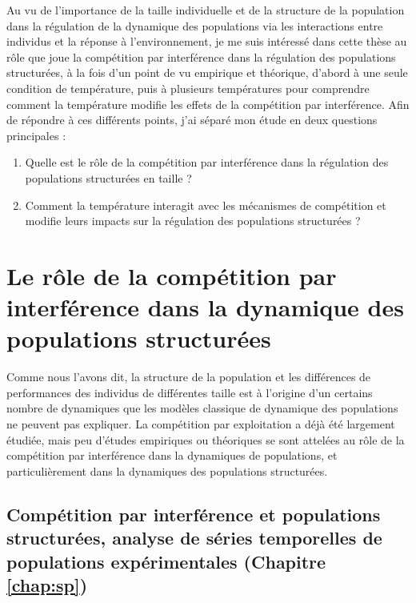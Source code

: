 Au vu de l'importance de la taille individuelle et de la structure de la
population dans la régulation de la dynamique des populations via les
interactions entre individus et la réponse à l'environnement, je me suis
intéressé dans cette thèse au rôle que joue la compétition par interférence dans
la régulation des populations structurées, à la fois d'un point de vu empirique
et théorique, d'abord à une seule condition de température, puis à plusieurs
températures pour comprendre comment la température modifie les effets de la
compétition par interférence. Afin de répondre à ces différents points, j'ai
séparé mon étude en deux questions principales :
\begin{enumerate}
  \item Quelle est le rôle de la compétition par interférence dans la régulation
  des populations structurées en taille ?
  \item Comment la température interagit avec les mécanismes de compétition et
  modifie leurs impacts sur la régulation des populations structurées ?
\end{enumerate}

\section{Le rôle de la compétition par interférence dans la dynamique des
populations structurées}

Comme nous l'avons dit, la structure de la population et les différences de
performances des individus de différentes taille est à l'origine d'un certains
nombre de dynamiques que les modèles classique de dynamique des populations ne
peuvent pas expliquer. La compétition par exploitation a déjà été largement
étudiée, mais peu d'études empiriques ou théoriques se sont attelées au rôle de
la compétition par interférence dans la dynamiques de populations, et
particulièrement dans la dynamiques des populations structurées.

\subsection{Compétition par interférence et populations structurées,
analyse de séries temporelles de populations expérimentales (Chapitre \ref{chap:sp})}

